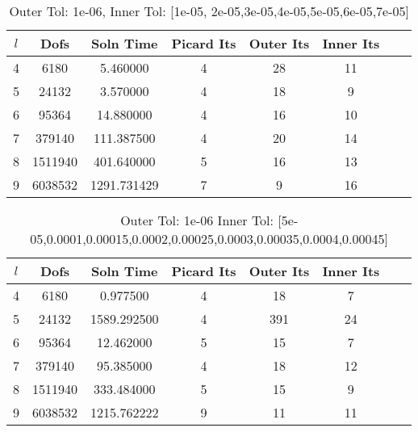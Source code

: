 \documentclass{article}
\begin{document}
\begin{table}[h!] \small
\begin{center}
\begin{tabular}{cccccccc}
\hline
$l$ &    Dofs & Soln Time & Picard Its & Outer Its & Inner Its \\
\hline
4 &     6180 &     5.460000 &                  4 &         28 &         11 \\
5 &    24132 &     3.570000 &                  4 &         18 &          9 \\
6 &    95364 &    14.880000 &                  4 &         16 &         10 \\
7 &   379140 &   111.387500 &                  4 &         20 &         14 \\
8 &  1511940 &   401.640000 &                  5 &         16 &         13 \\
9 &  6038532 &  1291.731429 &                  7 &          9 &         16 \\
\hline
\end{tabular}
\caption{Outer Tol:   1e-06, Inner Tol:    [1e-05, 2e-05,3e-05,4e-05,5e-05,6e-05,7e-05]}

\end{center}
\end{table}


\begin{table}[h!] \small
\begin{center}
\begin{tabular}{cccccccc}
\hline
$l$ &    Dofs & Soln Time & Picard Its & Outer Its & Inner Its \\
\hline
4 &     6180 &     0.977500 &                  4 &         18 &          7 \\
5 &    24132 &  1589.292500 &                  4 &        391 &         24 \\
6 &    95364 &    12.462000 &                  5 &         15 &          7 \\
7 &   379140 &    95.385000 &                  4 &         18 &         12 \\
8 &  1511940 &   333.484000 &                  5 &         15 &          9 \\
9 &  6038532 &  1215.762222 &                  9 &         11 &         11 \\
\hline
\end{tabular}
\caption{Outer Tol:   1e-06 Inner Tol:    [5e-05,0.0001,0.00015,0.0002,0.00025,0.0003,0.00035,0.0004,0.00045]}

\end{center}
\end{table}
\end{document}
